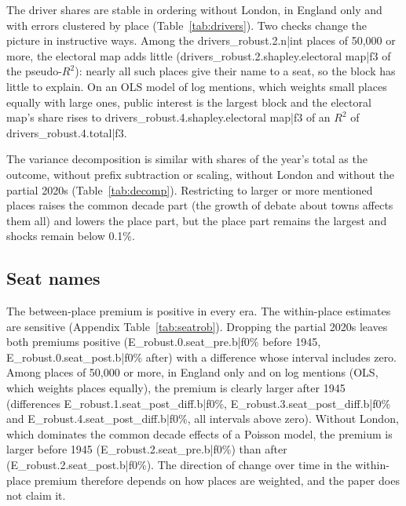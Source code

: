 \documentclass[11pt,a4paper]{article}
\begin{document}
The driver shares are stable in ordering without London, in England only and with errors clustered by place (Table~\ref{tab:drivers}). Two checks change the picture in instructive ways. Among the {{drivers_robust.2.n|int}} places of 50,000 or more, the electoral map adds little ({{drivers_robust.2.shapley.electoral map|f3}} of the pseudo-$R^2$): nearly all such places give their name to a seat, so the block has little to explain. On an OLS model of log mentions, which weights small places equally with large ones, public interest is the largest block and the electoral map's share rises to {{drivers_robust.4.shapley.electoral map|f3}} of an $R^2$ of {{drivers_robust.4.total|f3}}.

The variance decomposition is similar with shares of the year's total as the outcome, without prefix subtraction or scaling, without London and without the partial 2020s (Table~\ref{tab:decomp}). Restricting to larger or more mentioned places raises the common decade part (the growth of debate about towns affects them all) and lowers the place part, but the place part remains the largest and shocks remain below 0.1\%.

\subsection{Seat names}
The between-place premium is positive in every era. The within-place estimates are sensitive (Appendix Table~\ref{tab:seatrob}). Dropping the partial 2020s leaves both premiums positive ({{E_robust.0.seat_pre.b|f0}}\% before 1945, {{E_robust.0.seat_post.b|f0}}\% after) with a difference whose interval includes zero. Among places of 50,000 or more, in England only and on log mentions (OLS, which weights places equally), the premium is clearly larger after 1945 (differences {{E_robust.1.seat_post_diff.b|f0}}\%, {{E_robust.3.seat_post_diff.b|f0}}\% and {{E_robust.4.seat_post_diff.b|f0}}\%, all intervals above zero). Without London, which dominates the common decade effects of a Poisson model, the premium is larger before 1945 ({{E_robust.2.seat_pre.b|f0}}\%) than after ({{E_robust.2.seat_post.b|f0}}\%). The direction of change over time in the within-place premium therefore depends on how places are weighted, and the paper does not claim it.
\end{document}
